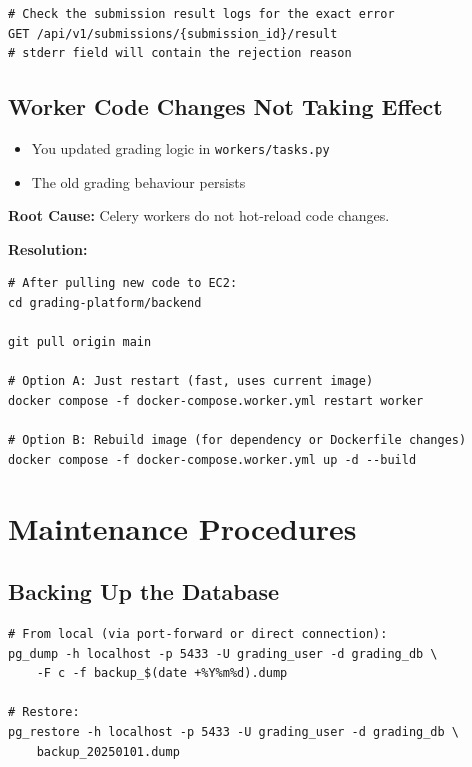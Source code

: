 \documentclass[12pt,a4paper]{article}
\begin{document}
\begin{lstlisting}[style=terminal]
# Check the submission result logs for the exact error
GET /api/v1/submissions/{submission_id}/result
# stderr field will contain the rejection reason
\end{lstlisting}

\subsection{Worker Code Changes Not Taking Effect}

\begin{troublebox}[Symptoms]
\begin{itemize}
  \item You updated grading logic in \texttt{workers/tasks.py}
  \item The old grading behaviour persists
\end{itemize}
\end{troublebox}

\textbf{Root Cause:} Celery workers do not hot-reload code changes.

\textbf{Resolution:}

\begin{lstlisting}[style=terminal]
# After pulling new code to EC2:
cd grading-platform/backend

git pull origin main

# Option A: Just restart (fast, uses current image)
docker compose -f docker-compose.worker.yml restart worker

# Option B: Rebuild image (for dependency or Dockerfile changes)
docker compose -f docker-compose.worker.yml up -d --build
\end{lstlisting}

\section{Maintenance Procedures}

\subsection{Backing Up the Database}

\begin{lstlisting}[style=terminal]
# From local (via port-forward or direct connection):
pg_dump -h localhost -p 5433 -U grading_user -d grading_db \
    -F c -f backup_$(date +%Y%m%d).dump

# Restore:
pg_restore -h localhost -p 5433 -U grading_user -d grading_db \
    backup_20250101.dump
\end{lstlisting}
\end{document}
